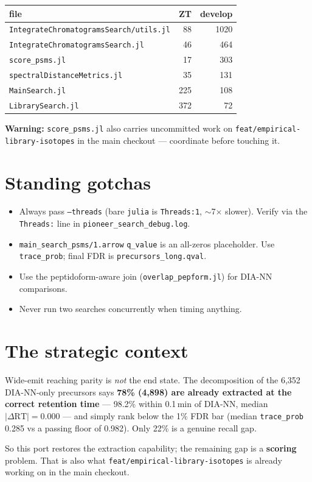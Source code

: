 \documentclass[11pt]{article}
\newcommand{\code}[1]{\texttt{\small #1}}
\begin{document}
\begin{center}
\begin{tabular}{lrr}
\toprule
\textbf{file} & \textbf{ZT} & \textbf{develop} \\
\midrule
\code{IntegrateChromatogramsSearch/utils.jl}  &  88 & 1020 \\
\code{IntegrateChromatogramsSearch.jl}        &  46 &  464 \\
\code{score\_psms.jl}                          &  17 &  303 \\
\code{spectralDistanceMetrics.jl}             &  35 &  131 \\
\code{MainSearch.jl}                          & 225 &  108 \\
\code{LibrarySearch.jl}                       & 372 &   72 \\
\bottomrule
\end{tabular}
\end{center}

\textbf{Warning:} \code{score\_psms.jl} also carries uncommitted work on
\code{feat/empirical-library-isotopes} in the main checkout --- coordinate before touching it.

\section{Standing gotchas}

\begin{itemize}[leftmargin=*,itemsep=0.2em]
  \item Always pass \code{--threads} (bare \code{julia} is \code{Threads:1}, $\sim$7$\times$
        slower). Verify via the \code{Threads:} line in \code{pioneer\_search\_debug.log}.
  \item \code{main\_search\_psms/1.arrow} \code{q\_value} is an all-zeros placeholder. Use
        \code{trace\_prob}; final FDR is \code{precursors\_long.qval}.
  \item Use the peptidoform-aware join (\code{overlap\_pepform.jl}) for DIA-NN comparisons.
  \item Never run two searches concurrently when timing anything.
\end{itemize}

\section{The strategic context}

Wide-emit reaching parity is \emph{not} the end state. The decomposition of the 6,352
DIA-NN-only precursors says \textbf{78\% (4,898) are already extracted at the correct retention
time} --- 98.2\% within 0.1\,min of DIA-NN, median $|\Delta \mathrm{RT}| = 0.000$ --- and simply
rank below the 1\% FDR bar (median \code{trace\_prob} 0.285 vs a passing floor of 0.982). Only
22\% is a genuine recall gap.

So this port restores the extraction capability; the remaining gap is a \textbf{scoring} problem.
That is also what \code{feat/empirical-library-isotopes} is already working on in the main
checkout.
\end{document}
